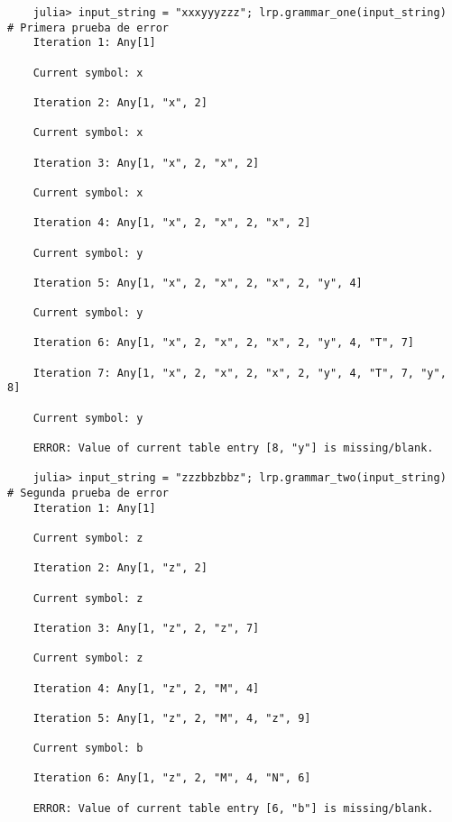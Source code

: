 \begin{verbatim}
    julia> input_string = "xxxyyyzzz"; lrp.grammar_one(input_string)    # Primera prueba de error
    Iteration 1: Any[1] 

    Current symbol: x 

    Iteration 2: Any[1, "x", 2] 

    Current symbol: x 

    Iteration 3: Any[1, "x", 2, "x", 2] 

    Current symbol: x 

    Iteration 4: Any[1, "x", 2, "x", 2, "x", 2] 

    Current symbol: y 

    Iteration 5: Any[1, "x", 2, "x", 2, "x", 2, "y", 4] 

    Current symbol: y 

    Iteration 6: Any[1, "x", 2, "x", 2, "x", 2, "y", 4, "T", 7] 

    Iteration 7: Any[1, "x", 2, "x", 2, "x", 2, "y", 4, "T", 7, "y", 8] 

    Current symbol: y 

    ERROR: Value of current table entry [8, "y"] is missing/blank.

    julia> input_string = "zzzbbzbbz"; lrp.grammar_two(input_string)    # Segunda prueba de error
    Iteration 1: Any[1] 

    Current symbol: z 

    Iteration 2: Any[1, "z", 2] 

    Current symbol: z 

    Iteration 3: Any[1, "z", 2, "z", 7] 

    Current symbol: z 

    Iteration 4: Any[1, "z", 2, "M", 4] 

    Iteration 5: Any[1, "z", 2, "M", 4, "z", 9] 

    Current symbol: b 

    Iteration 6: Any[1, "z", 2, "M", 4, "N", 6] 

    ERROR: Value of current table entry [6, "b"] is missing/blank.
\end{verbatim}

